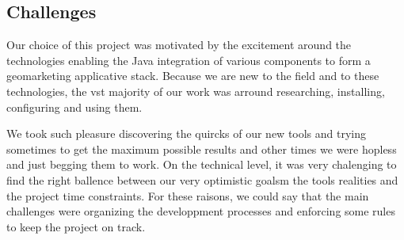 \subsection{Challenges}
Our choice of this project was motivated by the excitement around the
technologies enabling the Java integration of various components to form a
geomarketing applicative stack. Because we are new to the field and to these
technologies, the vst majority of our work was arround researching, installing,
configuring and using them.

We took such pleasure discovering the quircks of our new tools and trying
sometimes to get the maximum possible results and other times we were hopless
and just begging them to work. On the technical level, it was very chalenging to
find the right ballence between our very optimistic goalsm the tools realities
and the project time constraints. For these raisons, we could say that the main
challenges were organizing the developpment processes and enforcing some rules
to keep the project on track.
